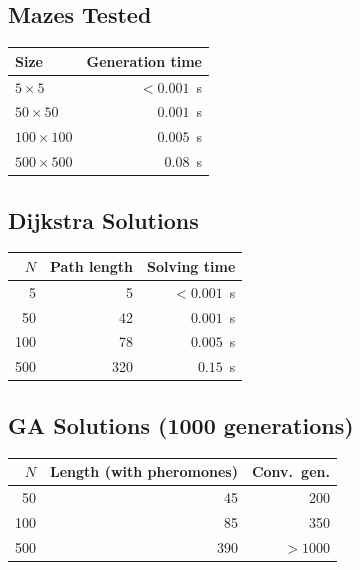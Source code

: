 \documentclass[12pt, a4paper]{article}
\theoremstyle{definition}
\begin{document}
\subsection{Mazes Tested}

\begin{center}
\begin{tabular}{lr}
    \toprule
    Size & Generation time \\
    \midrule
    $5 \times 5$     & $< 0.001$~s \\
    $50 \times 50$   & $0.001$~s   \\
    $100 \times 100$ & $0.005$~s   \\
    $500 \times 500$ & $0.08$~s    \\
    \bottomrule
\end{tabular}
\end{center}

\subsection{Dijkstra Solutions}

\begin{center}
\begin{tabular}{rrr}
    \toprule
    $N$ & Path length & Solving time \\
    \midrule
    5   & 5   & $< 0.001$~s \\
    50  & 42  & $0.001$~s   \\
    100 & 78  & $0.005$~s   \\
    500 & 320 & $0.15$~s    \\
    \bottomrule
\end{tabular}
\end{center}

\subsection{GA Solutions (1000 generations)}

\begin{center}
\begin{tabular}{rrr}
    \toprule
    $N$ & Length (with pheromones) & Conv.\ gen. \\
    \midrule
    50  & 45  & 200      \\
    100 & 85  & 350      \\
    500 & 390 & $> 1000$ \\
    \bottomrule
\end{tabular}
\end{center}
\end{document}
